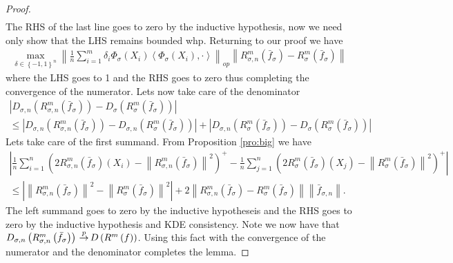 \documentclass{article} %
\def\kde{{\bar{f}_{\sigma,n}}} %
\def\gkde{{\bar{f}_\sigma}} %
\def\fm{{\Phi_\sigma}} %
\def\cip{\,{\buildrel p \over \rightarrow}\,}
\def\irwlm{{R_{\sigma,n}^{m}}}
\def\girwlm{{R_{\sigma}^m}}
\def\l{\left}
\def\r{\right}
\theoremstyle{definition}
\begin{document}
\begin{proof}
\begin{eqnarray*}
	\end{eqnarray*}
	The RHS of the last line goes to zero by the inductive hypothesis, now  we need only show that the LHS remains bounded whp.         Returning to our proof we have
        \begin{eqnarray*}
		 \max_{\delta\in \left\{ -1,1 \right\}^n}\l\| \frac{1}{n} \sum_{i=1}^m \delta_i\fm\left( X_i \right)\l<\fm(X_i),\cdot \r> \r\|_{op} \l\|  \irwlm \left(\gkde  \right) - \girwlm \left(\gkde  \right)    \r\|
        \end{eqnarray*}
        where the LHS goes to 1 and the RHS goes to zero thus completing the convergence of the numerator. Lets now take care of the denominator
        \begin{eqnarray*}
            \l| D_{\sigma,n} \left( R_{\sigma,n}^m\left( \gkde \right) \right)- D_{\sigma}\left( R_{\sigma}^m \left( \gkde \right) \right)  \r|\\
            \le\l| D_{\sigma,n} \left( R_{\sigma,n}^m\left( \gkde \right) \right)- D_{\sigma,n}\left( R_{\sigma}^m \left( \gkde \right) \right)  \r|+ \l| D_{\sigma,n} \left( R_{\sigma}^m\left( \gkde \right) \right)- D_{\sigma}\left( R_{\sigma}^m \left( \gkde \right) \right)  \r|
        \end{eqnarray*}
        Lets take care of the first summand. From Proposition \ref{pro:big} we have
        \begin{eqnarray*}
             \l| \frac{1}{n} \sum_{i=1}^n\left( 2R_{\sigma,n}^m\left( \gkde \right)\left( X_i \right) - \l\|R_{\sigma,n}^m \left( \gkde \right)\r\|^2 \right)^+  -  \frac{1}{n} \sum_{j=1}^n\left( 2R_{\sigma}^m\left( \gkde \right)\left( X_j \right) - \l\|R_{\sigma}^m \left( \gkde \right)\r\|^2 \right)^+ \r|\\
             \le \l|   \l\|R_{\sigma,n}^m \left( \gkde \right)\r\|^2 - \l\|R_{\sigma}^m \left( \gkde \right)\r\|^2 \r| +   2\l\|R_{\sigma,n}^m\left( \gkde \right) - R_{\sigma}^m\left( \gkde \right)\r\| \l\|\kde \r\|.
        \end{eqnarray*}
        The left summand goes to zero by the inductive hypotheseis and the RHS goes to zero by the inductive hypothesis and KDE consistency.
        Note we now have that $D_{\sigma,n}\left( R_{\sigma,n}^m\left( \gkde \right) \right) \cip D\left(R^m\left( f \right) \right)$. Using this fact with the convergence of the numerator and the denominator completes the lemma.
\end{proof}
\end{document}
